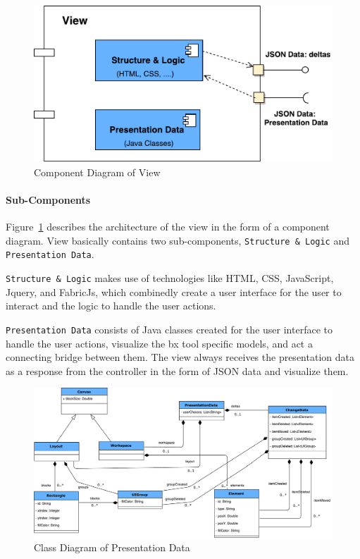 \begin{figure}[h]
	\includegraphics[width=1\textwidth]{figures/Component_Diagram-View}
	\caption{Component Diagram of View}
	\label{fig:Component_Diagram-View}
\end{figure}

\paragraph{Sub-Components}
Figure~\ref{fig:Component_Diagram-View} describes the architecture of the view in the form of a component diagram. View basically contains two sub-components, \texttt{Structure \& Logic} and \texttt{Presentation Data}. 

\texttt{Structure \& Logic} makes use of technologies like HTML, CSS, JavaScript, Jquery, and FabricJs, which combinedly create a user interface for the user to interact and the logic to handle the user actions. 

\texttt{Presentation Data} consists of Java classes created for the user interface to handle the user actions, visualize the bx tool specific models, and act a connecting bridge between them.
The view always receives the presentation data as a response from the controller in the form of JSON data and visualize them.

\begin{figure}
	\includegraphics[width=1\textwidth]{figures/ClassDia_UI-Models}
	\caption{Class Diagram of Presentation Data}
	\label{fig:ClassDia_UI-Models}
\end{figure}

